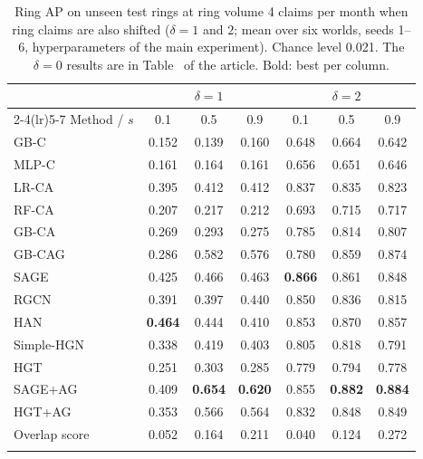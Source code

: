 \begin{table}[h]
\caption{Ring AP on unseen test rings at ring volume 4 claims per month when ring claims are also shifted ($\delta=1$ and $2$; mean over six worlds, seeds 1--6, hyperparameters of the main experiment). Chance level 0.021. The $\delta=0$ results are in Table~\MainTabLowVolume{} of the article. Bold: best per column.}\label{tab:lowvolume_shift}
\scriptsize
\setlength{\tabcolsep}{3.5pt}
\begin{tabular}{@{}lcccccc@{}}
\toprule
 & \multicolumn{3}{c}{$\delta=1$} & \multicolumn{3}{c}{$\delta=2$} \\
\cmidrule(lr){2-4}\cmidrule(lr){5-7}
Method / $s$ & 0.1 & 0.5 & 0.9 & 0.1 & 0.5 & 0.9 \\
\midrule
GB-C & 0.152 & 0.139 & 0.160 & 0.648 & 0.664 & 0.642 \\
MLP-C & 0.161 & 0.164 & 0.161 & 0.656 & 0.651 & 0.646 \\
LR-CA & 0.395 & 0.412 & 0.412 & 0.837 & 0.835 & 0.823 \\
RF-CA & 0.207 & 0.217 & 0.212 & 0.693 & 0.715 & 0.717 \\
GB-CA & 0.269 & 0.293 & 0.275 & 0.785 & 0.814 & 0.807 \\
GB-CAG & 0.286 & 0.582 & 0.576 & 0.780 & 0.859 & 0.874 \\
\midrule
SAGE & 0.425 & 0.466 & 0.463 & \textbf{0.866} & 0.861 & 0.848 \\
RGCN & 0.391 & 0.397 & 0.440 & 0.850 & 0.836 & 0.815 \\
HAN & \textbf{0.464} & 0.444 & 0.410 & 0.853 & 0.870 & 0.857 \\
Simple-HGN & 0.338 & 0.419 & 0.403 & 0.805 & 0.818 & 0.791 \\
HGT & 0.251 & 0.303 & 0.285 & 0.779 & 0.794 & 0.778 \\
\midrule
SAGE+AG & 0.409 & \textbf{0.654} & \textbf{0.620} & 0.855 & \textbf{0.882} & \textbf{0.884} \\
HGT+AG & 0.353 & 0.566 & 0.564 & 0.832 & 0.848 & 0.849 \\
Overlap score & 0.052 & 0.164 & 0.211 & 0.040 & 0.124 & 0.272 \\
\botrule
\end{tabular}
\end{table}